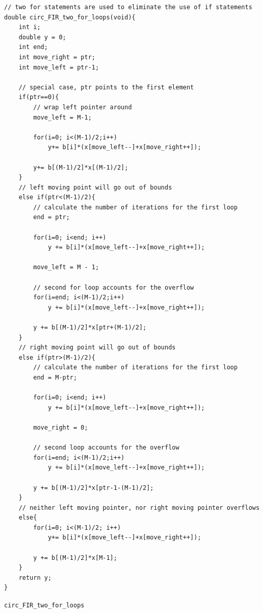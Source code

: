 \documentclass{article}
\begin{document}
\begin{listing}[H]
\begin{verbatim}
// two for statements are used to eliminate the use of if statements
double circ_FIR_two_for_loops(void){					
    int i;				
    double y = 0;
    int end;	
    int move_right = ptr;
    int move_left = ptr-1;
    
    // special case, ptr points to the first element
    if(ptr==0){
        // wrap left pointer around
        move_left = M-1;
        
        for(i=0; i<(M-1)/2;i++)			
            y+= b[i]*(x[move_left--]+x[move_right++]);
        
        y+= b[(M-1)/2]*x[(M-1)/2];			
    }
    // left moving point will go out of bounds
    else if(ptr<(M-1)/2){
        // calculate the number of iterations for the first loop
        end = ptr;
        
        for(i=0; i<end; i++)			
            y += b[i]*(x[move_left--]+x[move_right++]);
        
        move_left = M - 1;
        
        // second for loop accounts for the overflow
        for(i=end; i<(M-1)/2;i++)			
            y += b[i]*(x[move_left--]+x[move_right++]);		
        
        y += b[(M-1)/2]*x[ptr+(M-1)/2];			
    }
    // right moving point will go out of bounds
    else if(ptr>(M-1)/2){
        // calculate the number of iterations for the first loop
        end = M-ptr;
        
        for(i=0; i<end; i++)			
            y += b[i]*(x[move_left--]+x[move_right++]);
        
        move_right = 0;
        
        // second loop accounts for the overflow
        for(i=end; i<(M-1)/2;i++)			
            y += b[i]*(x[move_left--]+x[move_right++]);		
        
        y += b[(M-1)/2]*x[ptr-1-(M-1)/2];			
    }
    // neither left moving pointer, nor right moving pointer overflows
    else{
        for(i=0; i<(M-1)/2; i++)			
            y+= b[i]*(x[move_left--]+x[move_right++]);	
            
        y += b[(M-1)/2]*x[M-1];			
    }				
    return y;				
}
\end{verbatim}
\caption{{\tt circ\_FIR\_two\_for\_loops}} 
\label{lst:two_for_loops}
\end{listing}
\end{document}
